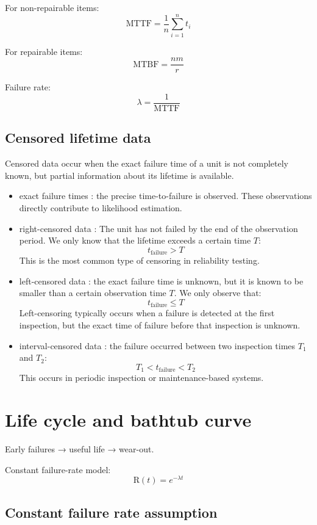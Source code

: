 \documentclass[10pt,a4paper,twocolumn]{article}
\newcommand{\bx}[1]{\boxed{#1}}
\newcommand{\R}{\mathrm{R}}
\newcommand{\MTTF}{\mathrm{MTTF}}
\newcommand{\MTBF}{\mathrm{MTBF}}
\begin{document}
For non-repairable items:
\[
\bx{\MTTF = \frac{1}{n}\sum_{i=1}^n t_i}
\]

For repairable items:
\[
\bx{\MTBF = \frac{n m}{r}}
\]

Failure rate:
\[
\bx{\lambda = \frac{1}{\MTTF}}
\]

\subsection*{Censored lifetime data}

Censored data occur when the exact failure time of a unit is not completely known, but partial information about its lifetime is available.
\begin{itemize}[leftmargin=*,itemsep=0pt]
\item exact failure times : the precise time-to-failure is observed. These observations directly contribute to likelihood estimation.
\item right-censored data : The unit has not failed by the end of the observation period.  We only know that the lifetime exceeds a certain time $T$:
\[t_{\text{failure}} > T\]
This is the most common type of censoring in reliability testing.
\item left-censored data : the exact failure time is unknown, but it is known to be smaller than a certain observation time $T$.  
We only observe that:
\[t_{\text{failure}} \le T\]
Left-censoring typically occurs when a failure is detected at the first inspection, but the exact time of failure before that inspection is unknown.
\item interval-censored data : the failure occurred between two inspection times $T_1$ and $T_2$:
\[T_1 < t_{\text{failure}} < T_2\]
This occurs in periodic inspection or maintenance-based systems.
\end{itemize}

\section*{Life cycle and bathtub curve}

Early failures → useful life → wear-out.

Constant failure-rate model:
\[
\bx{\R(t)=e^{-\lambda t}}
\]
\subsection*{Constant failure rate assumption}
\end{document}
